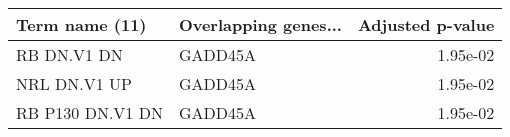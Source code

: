 \begin{tabular}{llr}
\toprule
  Term name (11) & Overlapping genes... &  Adjusted p-value \\
\midrule
     RB DN.V1 DN &              GADD45A &          1.95e-02 \\
    NRL DN.V1 UP &              GADD45A &          1.95e-02 \\
RB P130 DN.V1 DN &              GADD45A &          1.95e-02 \\
\bottomrule
\end{tabular}
